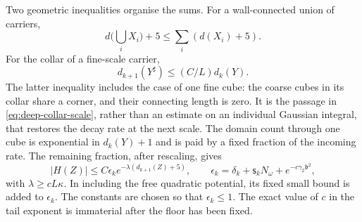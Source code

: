 \documentclass[11pt,letterpaper,reqno]{amsart}
\theoremstyle{definition}
\theoremstyle{remark}
\begin{document}
Two geometric inequalities organise the sums. For a wall-connected
union of carriers,
\begin{equation}\label{eq:deep-carrier-length}
 d\Big(\bigcup_iX_i\Big)+5
                    \le\sum_i(d(X_i)+5).
\end{equation}
For the collar of a fine-scale carrier,
\begin{equation}\label{eq:deep-collar-scale}
 d_{k+1}(Y^\sharp)\le (C/L)d_k(Y).
\end{equation}
The latter inequality includes the case of one fine cube: the
coarse cubes in its collar share a corner, and their connecting
length is zero. It is the passage in
\eqref{eq:deep-collar-scale}, rather than an estimate on an
individual Gaussian integral, that restores the decay rate at
the next scale. The domain count through one cube is exponential
in $d_k(Y)+1$ and is paid by a fixed fraction of the incoming
rate. The remaining fraction, after rescaling, gives
\begin{equation}\label{eq:deep-gas-bound}
 |H(Z)|\le C\epsilon_k
              e^{-\lambda(d_{k+1}(Z)+5)},\qquad
 \epsilon_k=\delta_k+\mathsf s_kN_\omega
                         +e^{-c\gamma_2\mathfrak b^2},
\end{equation}
with $\lambda\ge cL\kappa$. In including the free quadratic
potential, its fixed small bound is added to $\epsilon_k$.
The constants are chosen so that $\epsilon_k\le1$. The exact
value of $c$ in the tail exponent is immaterial after the floor
has been fixed.
\end{document}
